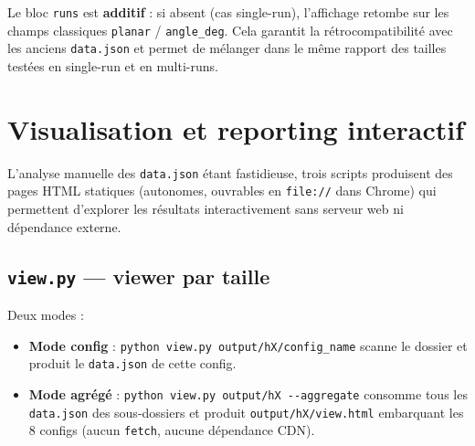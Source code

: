 \documentclass[12pt,a4paper]{article}
\theoremstyle{definition}
\begin{document}
\begin{remarque}
  Le bloc \texttt{runs} est \textbf{additif} : si absent (cas single-run), l'affichage
  retombe sur les champs classiques \texttt{planar} / \texttt{angle\_deg}. Cela garantit la
  rétrocompatibilité avec les anciens \texttt{data.json} et permet de mélanger dans le même
  rapport des tailles testées en single-run et en multi-runs.
\end{remarque}

\section{Visualisation et reporting interactif}

L'analyse manuelle des \texttt{data.json} étant fastidieuse, trois scripts produisent des
pages HTML statiques (autonomes, ouvrables en \texttt{file://} dans Chrome) qui permettent
d'explorer les résultats interactivement sans serveur web ni dépendance externe.

\subsection{\texttt{view.py} — viewer par taille}

Deux modes :
\begin{itemize}
  \item \textbf{Mode config} : \texttt{python view.py output/hX/config\_name} scanne le
    dossier et produit le \texttt{data.json} de cette config.
  \item \textbf{Mode agrégé} : \texttt{python view.py output/hX -{}-aggregate} consomme tous
    les \texttt{data.json} des sous-dossiers et produit \texttt{output/hX/view.html}
    embarquant les 8 configs (aucun \texttt{fetch}, aucune dépendance CDN).
\end{itemize}
\end{document}

